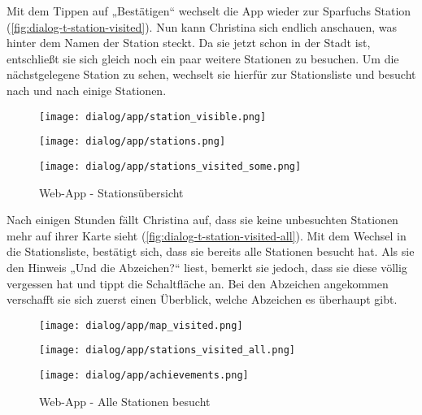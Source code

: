 Mit dem Tippen auf „Bestätigen“ wechselt die App wieder zur Sparfuchs Station
(\autoref{fig:dialog-t-station-visited}). Nun kann Christina sich endlich
anschauen, was hinter dem Namen der Station steckt. Da sie jetzt schon in der
Stadt ist, entschließt sie sich gleich noch ein paar weitere Stationen zu
besuchen. Um die nächstgelegene Station zu sehen, wechselt sie hierfür zur
Stationsliste und besucht nach und nach einige Stationen.

\begin{figure}[htpb]
    \centering
    \begin{minipage}{.325\textwidth}
        \centering
        \texttt{[image: dialog/app/station\_visible.png]}
    \end{minipage}%
    \begin{minipage}{.325\textwidth}
        \centering
        \texttt{[image: dialog/app/stations.png]}
    \end{minipage}
    \begin{minipage}{.325\textwidth}
        \centering
        \texttt{[image: dialog/app/stations\_visited\_some.png]}
    \end{minipage}
    \caption{Web-App - Stationsübersicht}
    \label{fig:dialog-t-station-visited}
\end{figure}

Nach einigen Stunden fällt Christina auf, dass sie keine unbesuchten Stationen
mehr auf ihrer Karte sieht (\autoref{fig:dialog-t-station-visited-all}). Mit dem
Wechsel in die Stationsliste, bestätigt sich, dass sie bereits alle Stationen
besucht hat. Als sie den Hinweis „Und die Abzeichen?“ liest, bemerkt sie jedoch,
dass sie diese völlig vergessen hat und tippt die Schaltfläche an. Bei den
Abzeichen angekommen verschafft sie sich zuerst einen Überblick, welche
Abzeichen es überhaupt gibt.

\begin{figure}[htpb]
    \centering
    \begin{minipage}{.325\textwidth}
        \centering
        \texttt{[image: dialog/app/map\_visited.png]}
    \end{minipage}%
    \begin{minipage}{.325\textwidth}
        \centering
        \texttt{[image: dialog/app/stations\_visited\_all.png]}
    \end{minipage}
    \begin{minipage}{.325\textwidth}
        \centering
        \texttt{[image: dialog/app/achievements.png]}
    \end{minipage}
    \caption{Web-App - Alle Stationen besucht}
    \label{fig:dialog-t-station-visited-all}
\end{figure}

